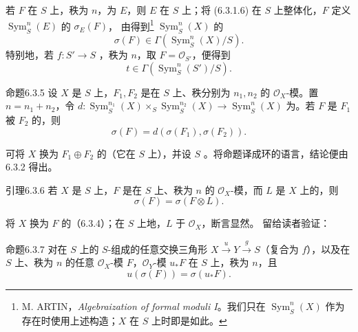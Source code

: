 若 $F$ 在 $S$ 上，秩为 $n$，为 $E$，则 $E$ 在 $S$ 上；将 (6.3.1.6) 在 $S$ 上整体化，$F$ 定义 $\operatorname{Sym}_S^n(E)$ 的 $\sigma_E(F)$，
由得到\footnote{M. ARTIN，\emph{Algebraization of formal moduli I}。我们只在 $\operatorname{Sym}_S^n(X)$ 作为存在时使用上述构造；$X$ 在 $S$ 上时即是如此。} $\operatorname{Sym}_S^n(X)$ 的
\[\sigma(F)\in\Gamma(\operatorname{Sym}_S^n(X)/S).\tag{6.3.4.1}\]
特别地，若 $f:S'\to S$ ，秩为 $n$，取 $F=\mathcal O_{S'}$，便得到
\[t\in\Gamma(\operatorname{Sym}_S^n(S')/S).\tag{6.3.4.2}\]
\begin{SGAresult}{命题}{6.3.5}
设 $X$ 是 $S$ 上，$F_1,F_2$ 是在 $S$ 上、秩分别为 $n_1,n_2$ 的 $\mathcal O_X$-模。置 $n=n_1+n_2$，令 $d:\operatorname{Sym}_S^{n_1}(X)\times_S\operatorname{Sym}_S^{n_2}(X)\to\operatorname{Sym}_S^n(X)$ 为。若 $F$ 是 $F_1$ 被 $F_2$ 的，则
\[\sigma(F)=d(\sigma(F_1),\sigma(F_2)).\]
\end{SGAresult}
可将 $X$ 换为 $F_1\oplus F_2$ 的（它在 $S$ 上），并设 $S$ 。将命题译成环的语言，结论便由 6.3.2 得出。
\begin{SGAresult}{引理}{6.3.6}
若 $X$ 是 $S$ 上，$F$ 是在 $S$ 上、秩为 $n$ 的 $\mathcal O_X$-模，而 $L$ 是 $X$ 上的，则
\[\sigma(F)=\sigma(F\otimes L).\]
\end{SGAresult}
将 $X$ 换为 $F$ 的（6.3.4）；在 $S$ 上地，$L$ 于 $\mathcal O_X$，断言显然。
留给读者验证：
\begin{SGAresult}{命题}{6.3.7}
对在 $S$ 上的 $S$-组成的任意交换三角形 $X\xrightarrow{u}Y\xrightarrow{g}S$（复合为 $f$），以及在 $S$ 上、秩为 $n$ 的任意 $\mathcal O_X$-模 $F$，$\mathcal O_Y$-模 $u_*F$ 在 $S$ 上，秩为 $n$，且
\[u(\sigma(F))=\sigma(u_*F).\]
\end{SGAresult}

